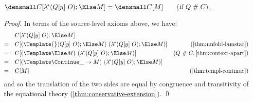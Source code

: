 \begin{lemma}
  \label{thm:context-lamstar-apart}

  $\den{C[\lamstar (Q[y] ~ O); \Else M]} = \den{C[M]}
  \qquad (\text{if } Q \apart C)$.
\end{lemma}
\begin{proof}
  In terms of the source-level axioms above, we have:
  \begin{align*}
    &\quad
    C[\lamstar (Q[y] ~ O); \Else M]
    \\
    =&\quad
    C[(\Template{} (Q[y] ~ O); \Else M) ~ (\lamstar (Q[y] ~ O); \Else M)]
    &(\cref{thm:unfold-lamstar})
    \\
    =&\quad
    C[(\Template \Else M) ~ (\lamstar (Q[y] ~ O); \Else M)]
    &(Q \apart C, \cref{thm:context-apart})
    \\
    =&\quad
    C[(\Template \Continue \_ \to M) ~ (\lamstar (Q[y] ~ O); \Else M)]
    \\
    =&\quad
    C[M]
    &(\cref{thm:templ-continue})
  \end{align*}
  and so the translation of the two sides are equal by congruence and transitivity of the equational theory (\cref{thm:conservative-extension}).
  \qed
\end{proof}


